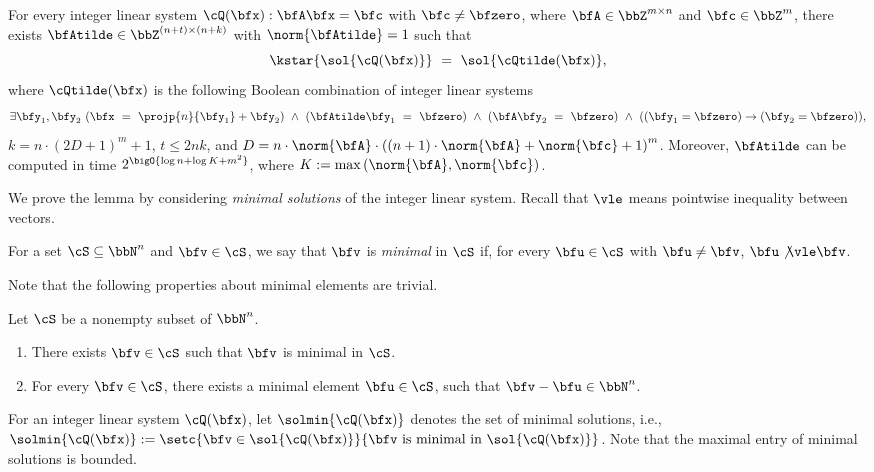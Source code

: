 \medskip

For every integer linear system $\cQ(\bfx): \bfA \bfx = \bfc$ with $\bfc \neq \bfzero$,
where $\bfA \in \bbZ^{m \times n}$ and $\bfc \in \bbZ^{m}$,
there exists $\bfAtilde \in \bbZ^{(n+t) \times (n+k)}$ with $\norm{\bfAtilde} = 1$
such that
\begin{equation*}
    \kstar{\sol{\cQ(\bfx)}}\ =\ \sol{\cQtilde(\bfx)},
\end{equation*}
where $\cQtilde(\bfx)$ is the following Boolean combination of integer linear systems
\begin{equation*}    
    \exists \bfy_1, \bfy_2\ 
    (\bfx\ =\ \projp{n}{\bfy_1} + \bfy_2)\ \land\ 
    (\bfAtilde\bfy_1\ =\ \bfzero)\ \land\ 
    (\bfA\bfy_2\ =\ \bfzero)\ \land\ 
    ((\bfy_1=\bfzero) \to (\bfy_2=\bfzero)),
\end{equation*}
$k = n\cdot(2D+1)^{m} + 1$,
$t \le 2nk$, and
$D = n \cdot \norm{\bfA} \cdot \left((n+1)\cdot \norm{\bfA} + \norm{\bfc} + 1\right)^{m}$.
Moreover, $\bfAtilde$ can be computed in time $2^\bigO{\log n + \log K + m^2}$,
where $K := \max\left(\norm{\bfA}, \norm{\bfc}\right)$.

\medskip

We prove the lemma by considering \emph{minimal solutions} of the integer linear system.
Recall that $\vle$ means pointwise inequality between vectors.
\begin{definition}
    For a set $\cS \subseteq \bbN^n$ and $\bfv \in \cS$,
    we say that $\bfv$ is \emph{minimal} in $\cS$
    if, for every $\bfu \in \cS$ with $\bfu \neq \bfv$,
     $\bfu \not\vle \bfv$.
\end{definition}

Note that the following properties about minimal elements are trivial.
\begin{lemma}\label{lem:min_property}
    Let $\cS$ be a nonempty subset of $\bbN^n$.
    \begin{enumerate}
        \item There exists $\bfv \in \cS$ such that $\bfv$ is minimal in $\cS$.
        \item For every $\bfv \in \cS$, there exists a minimal element $\bfu \in \cS$,
            such that $\bfv - \bfu \in \bbN^n$.
    \end{enumerate}
\end{lemma}

For an integer linear system $\cQ(\bfx)$,
let $\solmin{\cQ(\bfx)}$ denotes the set of minimal solutions,
i.e., $\solmin{\cQ(\bfx)} := \setc{\bfv \in \sol{\cQ(\bfx)}}{\bfv\ \text{is minimal in}\ \sol{\cQ(\bfx)}}$.
Note that the maximal entry of minimal solutions is bounded.

